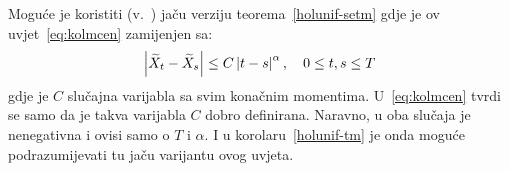 \documentclass[main.tex]{subfiles}
\begin{document}
\begin{komentar}
	Moguće je koristiti (v.~\cite[lema~3.6]{ayache}) jaču verziju teorema~\ref{holunif-setm}
	gdje je \holder ov uvjet~\eqref{eq:kolmcen} zamijenjen sa:
	\begin{equation}
		\left| {\widetilde{X}_t - \widetilde{X}_s} \right| \le C \left| {t-s} \right|^\alpha, \quad 0 \le t,s \le T
	\end{equation}
	gdje je \( C \) slučajna varijabla sa svim konačnim momentima.
	U~\eqref{eq:kolmcen} tvrdi se samo da je takva varijabla \( C \)
	dobro definirana.
	Naravno, u oba slučaja je nenegativna i ovisi samo o \( T \) i \( \alpha \).
	I u korolaru~\ref{holunif-tm} je onda moguće
	podrazumijevati tu jaču varijantu \holder ovog uvjeta.
\end{komentar}
\end{document}
